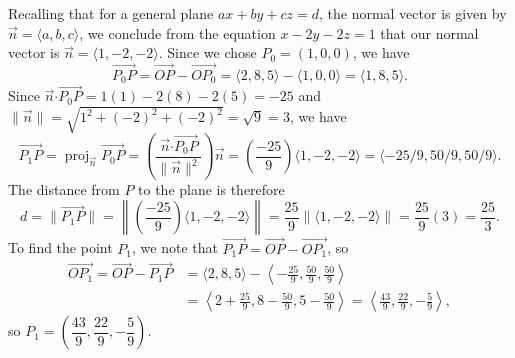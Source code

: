 \documentclass[12pt]{article}
\newcommand{\len}[1]{\lVert #1\rVert}
\newcommand{\dotp}{\boldsymbol{\cdot}}
\DeclareMathOperator{\proj}{proj}
\begin{document}
\begin{enumerate}
Recalling that for a general plane $ax+by+cz=d$, the normal vector is given by $\vec{n} = \langle a, b, c\rangle$, we conclude from the equation $x-2y-2z=1$ that our normal vector is $\vec{n} = \langle 1, -2, -2\rangle$. Since we chose $P_0=(1,0,0)$, we have
\[
 \overrightarrow{P_0P} = \overrightarrow{OP}-\overrightarrow{OP_0} = \langle 2, 8, 5\rangle - \langle 1, 0, 0\rangle = \langle 1, 8, 5\rangle.
\]
Since $\vec{n}\dotp\overrightarrow{P_0P} = 1(1)-2(8)-2(5) = -25$ and $\len{\vec{n}} = \sqrt{1^2+(-2)^2+(-2)^2} = \sqrt{9}=3$, we have
\[
 \overrightarrow{P_1P} = \proj_{\vec{n}}\overrightarrow{P_0P} = \left(\frac{\vec{n}\dotp\overrightarrow{P_0P}}{\len{\vec{n}}^2}\right)\vec{n} = \left(\frac{-25}{9}\right)\langle 1, -2, -2\rangle = \langle -25/9, 50/9, 50/9\rangle.
\]
The distance from $P$ to the plane is therefore
\[
 d=\len{\overrightarrow{P_1P}} = \left\lVert \left(\frac{-25}{9}\right)\langle 1, -2, -2\rangle\right\rVert = \frac{25}{9}\left\lVert \langle 1, -2, -2\rangle\right\rVert = \frac{25}{9}(3) = \frac{25}{3}.
\]
To find the point $P_1$, we note that $\overrightarrow{P_1P} = \overrightarrow{OP}-\overrightarrow{OP_1}$, so
\begin{align*}
 \overrightarrow{OP_1} = \overrightarrow{OP}-\overrightarrow{P_1P} &= \langle 2, 8, 5\rangle - \left\langle -\frac{25}{9}, \frac{50}{9}, \frac{50}{9}\right\rangle\\
& = \left\langle 2+\frac{25}{9}, 8-\frac{50}{9}, 5-\frac{50}{9}\right\rangle = \left\langle \frac{43}{9}, \frac{22}{9}, -\frac{5}{9}\right\rangle,
\end{align*}
so $P_1 = \left(\dfrac{43}{9},\dfrac{22}{9},-\dfrac{5}{9}\right)$.

\pagebreak


\end{enumerate}
\end{document}
